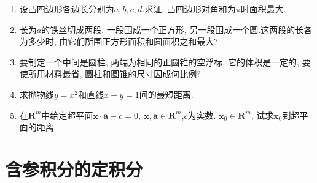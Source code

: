 \begin{enumerate}
\item 设凸四边形各边长分别为$a,b,c,d$.求证: 凸四边形对角和为$\pi$时面积最大.
\item 长为$a$的铁丝切成两段, 一段围成一个正方形, 另一段围成一个圆.这两段的长各为多少时, 由它们所围正方形面积和圆面积之和最大?
\item 要制定一个中间是圆柱, 两端为相同的正圆锥的空浮标, 它的体积是一定的, 要使所用材料最省, 圆柱和圆锥的尺寸因成何比例?
\item 求抛物线$y=x^2$和直线$x-y=1$间的最短距离.
	\item 在$\bm{R}^m$中给定超平面$\bm{x}\cdot\bm{a}-c=0,\ \bm{x,a}\in \bm{R}^m$,$c$为实数. $\bm{x}_0\in \bm{R}^m$, 试求$\bm{x}_0$到超平面的距离.
\end{enumerate}
\section{含参积分的定积分}
